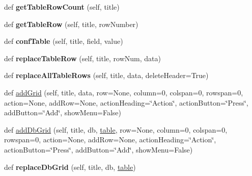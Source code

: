 \begin{DoxyCompactItemize}
def {\bfseries get\+Table\+Row\+Count} (self, title)
\item 
\mbox{\label{class_python_01_g_u_i_1_1appjar_1_1gui_ae1e92a69a001532d3dc6bb2debf22f2f}} 
def {\bfseries get\+Table\+Row} (self, title, row\+Number)
\item 
\mbox{\label{class_python_01_g_u_i_1_1appjar_1_1gui_ab899b3c2731e0ff001ef4b3e356ff63c}} 
def {\bfseries conf\+Table} (self, title, field, value)
\item 
\mbox{\label{class_python_01_g_u_i_1_1appjar_1_1gui_a22f2cd65ce5e82e5968fe989ce7a6fc3}} 
def {\bfseries replace\+Table\+Row} (self, title, row\+Num, data)
\item 
\mbox{\label{class_python_01_g_u_i_1_1appjar_1_1gui_a4dbf6f716fcf15fc3acbea4e179abf98}} 
def {\bfseries replace\+All\+Table\+Rows} (self, title, data, delete\+Header=True)
\item 
def \hyperlink{class_python_01_g_u_i_1_1appjar_1_1gui_abcc4ab3e43d1c126773b6131fcfca071}{add\+Grid} (self, title, data, row=None, column=0, colspan=0, rowspan=0, action=None, add\+Row=None, action\+Heading=\char`\"{}Action\char`\"{}, action\+Button=\char`\"{}Press\char`\"{}, add\+Button=\char`\"{}Add\char`\"{}, show\+Menu=False)
\item 
def \hyperlink{class_python_01_g_u_i_1_1appjar_1_1gui_ae958a26820bc6df226990c474cd3e475}{add\+Db\+Grid} (self, title, db, \hyperlink{class_python_01_g_u_i_1_1appjar_1_1gui_a53e86304a35d41e135f8449ad83a3640}{table}, row=None, column=0, colspan=0, rowspan=0, action=None, add\+Row=None, action\+Heading=\char`\"{}Action\char`\"{}, action\+Button=\char`\"{}Press\char`\"{}, add\+Button=\char`\"{}Add\char`\"{}, show\+Menu=False)
\item 
\mbox{\label{class_python_01_g_u_i_1_1appjar_1_1gui_a85d34ce01cf7209592d4a547d997bb0d}} 
def {\bfseries replace\+Db\+Grid} (self, title, db, \hyperlink{class_python_01_g_u_i_1_1appjar_1_1gui_a53e86304a35d41e135f8449ad83a3640}{table})
\item 
\mbox{\label{class_python_01_g_u_i_1_1appjar_1_1gui_a9f335c75b41e6a7e0212876e05b2d3db}} 

\end{DoxyCompactItemize}
